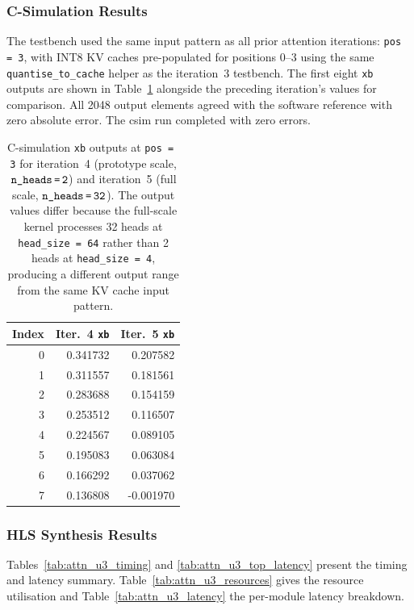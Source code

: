 \subsubsection{C-Simulation Results}
\label{subsubsec:attn_update3_csim}

The testbench used the same input pattern as all prior attention iterations:
\texttt{pos\,=\,3}, with INT8 KV caches pre-populated for positions 0--3 using
the same \texttt{quantise\_to\_cache} helper as the iteration~3 testbench. The
first eight \texttt{xb} outputs are shown in
Table~\ref{tab:attn_csim_all_update3} alongside the preceding iteration's
values for comparison. All 2048 output elements agreed with the software
reference with zero absolute error. The csim run completed with zero errors.

\begin{table}[H]
  \centering
  \begin{tabular}{rrr}
    \toprule
    Index & Iter.~4 \texttt{xb} & Iter.~5 \texttt{xb} \\
    \midrule
    0 & 0.341732 & 0.207582 \\
    1 & 0.311557 & 0.181561 \\
    2 & 0.283688 & 0.154159 \\
    3 & 0.253512 & 0.116507 \\
    4 & 0.224567 & 0.089105 \\
    5 & 0.195083 & 0.063084 \\
    6 & 0.166292 & 0.037062 \\
    7 & 0.136808 & -0.001970 \\
    \bottomrule
  \end{tabular}
  \caption{C-simulation \texttt{xb} outputs at \texttt{pos\,=\,3} for
           iteration~4 (prototype scale, $\texttt{n\_heads\,=\,2}$) and
           iteration~5 (full scale, $\texttt{n\_heads\,=\,32}$). The
           output values differ because the full-scale kernel processes
           32 heads at \texttt{head\_size\,=\,64} rather than 2 heads
           at \texttt{head\_size\,=\,4}, producing a different output
           range from the same KV cache input pattern.}
  \label{tab:attn_csim_all_update3}
\end{table}

\subsubsection{HLS Synthesis Results}
\label{subsubsec:attn_update3_csyn}

Tables~\ref{tab:attn_u3_timing} and \ref{tab:attn_u3_top_latency}
present the timing and latency summary. Table~\ref{tab:attn_u3_resources}
gives the resource utilisation and Table~\ref{tab:attn_u3_latency} the
per-module latency breakdown.

